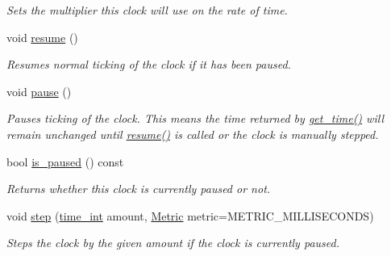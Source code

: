 \begin{DoxyCompactItemize}
\begin{DoxyCompactList}\small\item\em Sets the multiplier this clock will use on the rate of time. \end{DoxyCompactList}\item 
void \hyperlink{classomi_1_1runtime_1_1_abstract_clock_a2e86653313c678dbd25db870405a89ba}{resume} ()
\begin{DoxyCompactList}\small\item\em Resumes normal ticking of the clock if it has been paused. \end{DoxyCompactList}\item 
void \hyperlink{classomi_1_1runtime_1_1_abstract_clock_af5f62abc082be6ee53d4d7a6cf0912a3}{pause} ()\hypertarget{classomi_1_1runtime_1_1_abstract_clock_af5f62abc082be6ee53d4d7a6cf0912a3}{}\label{classomi_1_1runtime_1_1_abstract_clock_af5f62abc082be6ee53d4d7a6cf0912a3}

\begin{DoxyCompactList}\small\item\em Pauses ticking of the clock. This means the time returned by \hyperlink{classomi_1_1runtime_1_1_abstract_clock_ab504674ae140328a3a4dd3a2b02b89c8}{get\+\_\+time()} will remain unchanged until \hyperlink{classomi_1_1runtime_1_1_abstract_clock_a2e86653313c678dbd25db870405a89ba}{resume()} is called or the clock is manually stepped. \end{DoxyCompactList}\item 
bool \hyperlink{classomi_1_1runtime_1_1_abstract_clock_ac7674af8453a01e81a929fbd45e871bf}{is\+\_\+paused} () const \hypertarget{classomi_1_1runtime_1_1_abstract_clock_ac7674af8453a01e81a929fbd45e871bf}{}\label{classomi_1_1runtime_1_1_abstract_clock_ac7674af8453a01e81a929fbd45e871bf}

\begin{DoxyCompactList}\small\item\em Returns whether this clock is currently paused or not. \end{DoxyCompactList}\item 
void \hyperlink{classomi_1_1runtime_1_1_abstract_clock_acba0e258c160ec6a19477f8558af19d7}{step} (\hyperlink{classomi_1_1runtime_1_1_abstract_clock_af2122541388aea885afc08e8135340f7}{time\+\_\+int} amount, \hyperlink{classomi_1_1runtime_1_1_abstract_clock_a6af6e30a02165469ffcdcbd512d47a1b}{Metric} metric=M\+E\+T\+R\+I\+C\+\_\+\+M\+I\+L\+L\+I\+S\+E\+C\+O\+N\+DS)
\begin{DoxyCompactList}\small\item\em Steps the clock by the given amount if the clock is currently paused. \end{DoxyCompactList}\end{DoxyCompactItemize}
